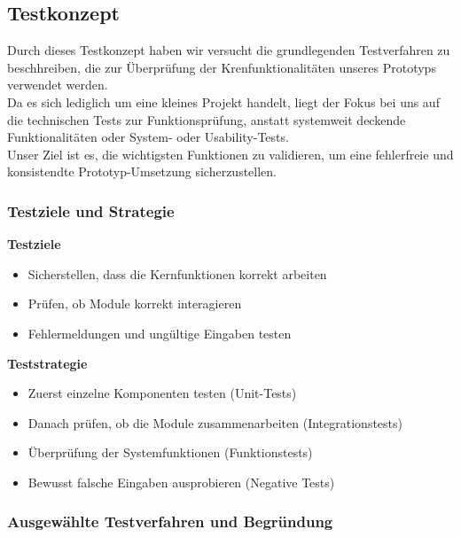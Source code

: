 \newpage
\subsection{Testkonzept}


Durch dieses Testkonzept haben wir versucht die grundlegenden Testverfahren zu beschhreiben, die zur Überprüfung der Krenfunktionalitäten unseres Prototyps verwendet werden.\\
Da es sich lediglich um eine kleines Projekt handelt, liegt der Fokus bei uns auf die technischen Tests zur Funktionsprüfung, anstatt systemweit deckende Funktionalitäten oder System- oder Usability-Tests.\\
Unser Ziel ist es, die wichtigsten Funktionen zu validieren, um eine fehlerfreie und konsistendte Prototyp-Umsetzung sicherzustellen.

\subsubsection{Testziele und Strategie}

\textbf{Testziele}

\begin{itemize}
	\item Sicherstellen, dass die Kernfunktionen korrekt arbeiten
	\item Prüfen, ob Module korrekt interagieren
	\item Fehlermeldungen und ungültige Eingaben testen
\end{itemize}

\textbf{Teststrategie}

\begin{itemize}
	\item Zuerst einzelne Komponenten testen (Unit-Tests)
	\item Danach prüfen, ob die Module zusammenarbeiten (Integrationstests)
	\item Überprüfung der Systemfunktionen (Funktionstests)
	\item Bewusst falsche Eingaben ausprobieren (Negative Tests)
\end{itemize}

\subsubsection{Ausgewählte Testverfahren und Begründung}


